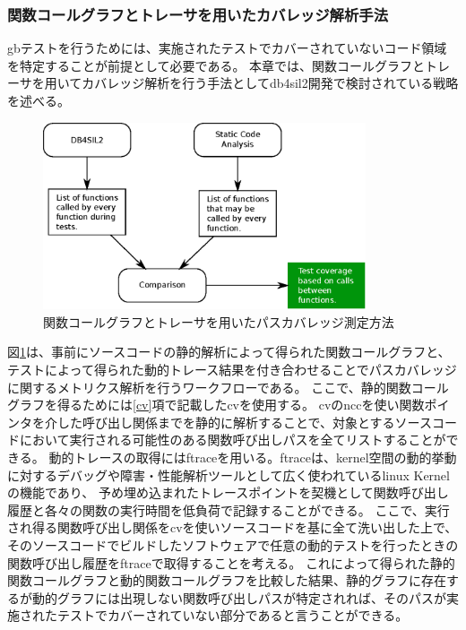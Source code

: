 \subsubsection{関数コールグラフとトレーサを用いたカバレッジ解析手法}
\label{callgraph}
\acrshort{gb}テストを行うためには、実施されたテストでカバーされていないコード領域を特定することが前提として必要である。
本章では、関数コールグラフとトレーサを用いてカバレッジ解析を行う手法として\acrshort{db4sil2}開発で検討されている戦略を述べる。
\begin{figure}[ht]
  \centering
  \includegraphics[width=0.85\textwidth]{pic/cov.eps}
  \caption{関数コールグラフとトレーサを用いたパスカバレッジ測定方法}
  \label{cov}
\end{figure}
\par
図\ref{cov}は、事前にソースコードの静的解析によって得られた関数コールグラフと、テストによって得られた動的トレース結果を付き合わせることでパスカバレッジに関するメトリクス解析を行うワークフローである。
ここで、静的関数コールグラフを得るためには\ref{cv}項で記載した\acrshort{cv}を使用する。
\acrshort{cv}のnccを使い関数ポインタを介した呼び出し関係までを静的に解析することで、対象とするソースコードにおいて実行される可能性のある関数呼び出しパスを全てリストすることができる。
動的トレースの取得には\gls{ftrace}を用いる。\acrshort{ftrace}は、kernel空間の動的挙動に対するデバッグや障害・性能解析ツールとして広く使われている\acrshort{linux} Kernelの機能であり、
予め埋め込まれたトレースポイントを契機として関数呼び出し履歴と各々の関数の実行時間を低負荷で記録することができる。
ここで、実行され得る関数呼び出し関係を\acrshort{cv}を使いソースコードを基に全て洗い出した上で、そのソースコードでビルドしたソフトウェアで任意の動的テストを行ったときの関数呼び出し履歴を\acrshort{ftrace}で取得することを考える。
これによって得られた静的関数コールグラフと動的関数コールグラフを比較した結果、静的グラフに存在するが動的グラフには出現しない関数呼び出しパスが特定されれば、そのパスが実施されたテストでカバーされていない部分であると言うことができる。
